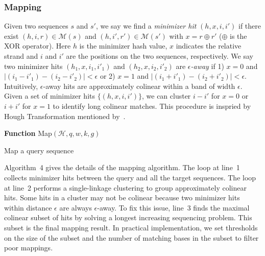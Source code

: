 \documentclass{bioinfo}
\begin{document}
\begin{methods}
\subsubsection{Mapping}

Given two sequences $s$ and $s'$, we say we find a \emph{minimizer hit}
$(h,x,i,i')$ if there exist $(h,i,r)\in\mathcal{M}(s)$ and
$(h,i',r')\in\mathcal{M}(s')$ with $x=r\oplus r'$ ($\oplus$ is the XOR
operator). Here $h$ is the minimizer hash value, $x$ indicates the relative
strand and $i$ and $i'$ are the positions on the two sequences, respectively.
We say two minimizer hits $(h_1,x,i_1,i'_1)$ and $(h_2,x,i_2,i'_2)$ are
\emph{$\epsilon$-away} if 1) $x=0$ and $|(i_1-i'_1)-(i_2-i'_2)|<\epsilon$
or 2) $x=1$ and $|(i_1+i'_1)-(i_2+i'_2)|<\epsilon$. Intuitively,
$\epsilon$-away hits are approximately colinear within a band of width
$\epsilon$.  Given a set of minimizer hits $\{(h,x,i,i')\}$, we can cluster
$i-i'$ for $x=0$ or $i+i'$ for $x=1$ to identify long colinear matches.
This procedure is inspried by Hough Transformation mentioned
by~\citet{sovic:2015aa}. 

\begin{algorithm}[ht]
\DontPrintSemicolon
\footnotesize
{}
\BlankLine
\textbf{Function} {\sc Map}$(\mathcal{H},q,w,k,g)$
\caption{Map a query sequence}
\end{algorithm}

Algorithm~4 gives the details of the mapping algorithm. The loop at line~1
collects minimizer hits between the query and all the target sequences. The
loop at line~2 performs a single-linkage clustering to group approximately
colinear hits. Some hits in a cluster may not be colinear because two minimizer
hits within distance $\epsilon$ are always $\epsilon$-away. To fix this issue,
line~3 finds the maximal colinear subset of hits by solving a longest
increasing sequencing problem. This subset is the final mapping result. In
practical implementation, we set thresholds on the size of the subset and the
number of matching bases in the subset to filter poor mappings.


\end{methods}
\end{document}
